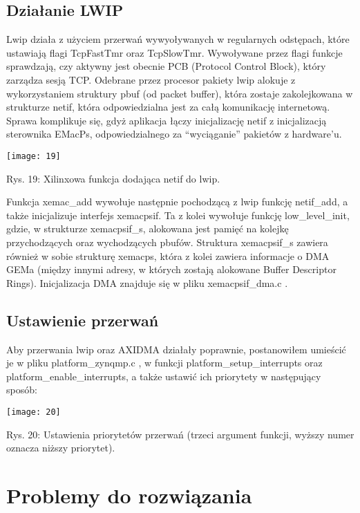 \documentclass[11pt, letterpaper]{article}
\begin{document}
\subsection{Działanie LWIP}
Lwip działa z użyciem przerwań wywyoływanych w regularnych odstępach, które ustawiają flagi TcpFastTmr oraz TcpSlowTmr. Wywoływane przez flagi funkcje sprawdzają, czy aktywny jest obecnie PCB (Protocol Control Block), który zarządza sesją TCP. Odebrane przez procesor pakiety lwip alokuje z wykorzystaniem struktury pbuf (od packet buffer), która zostaje zakolejkowana w strukturze netif, która odpowiedzialna jest za całą komunikację internetową.
Sprawa komplikuje się, gdyż aplikacja łączy inicjalizację netif z inicjalizacją sterownika EMacPs, odpowiedzialnego za “wyciąganie” pakietów z hardware’u.

\texttt{[image: 19]}
\begin{center}
    \caption{Rys. 19: Xilinxowa funkcja dodająca netif do lwip.}
\end{center}
\vspace{5mm}

Funkcja xemac\_add wywołuje następnie pochodzącą z lwip funkcję netif\_add, a także inicjalizuje interfejs xemacpsif. Ta z kolei wywołuje funkcję low\_level\_init, gdzie, w strukturze xemacpsif\_s, alokowana jest pamięć na kolejkę przychodzących oraz wychodzących pbufów. Struktura xemacpsif\_s zawiera również w sobie strukturę xemacps, która z kolei zawiera informacje o DMA GEMa (między innymi adresy, w których zostają alokowane Buffer Descriptor Rings). Inicjalizacja DMA znajduje się w pliku
xemacpsif\_dma.c .

\subsection{Ustawienie przerwań}
Aby przerwania lwip oraz AXIDMA działały poprawnie, postanowiłem umieścić je w pliku platform\_zynqmp.c , w funkcji platform\_setup\_interrupts oraz platform\_enable\_interrupts, a także ustawić ich priorytety w następujący sposób:

\texttt{[image: 20]}
\begin{center}
    \caption{Rys. 20: Ustawienia priorytetów przerwań (trzeci argument funkcji, wyższy numer oznacza niższy priorytet).}
\end{center}
\vspace{5mm}

\section{Problemy do rozwiązania}
\end{document}

